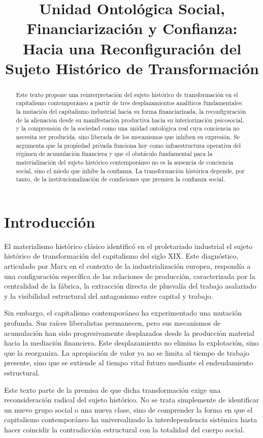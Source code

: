\documentclass[12pt,a4paper]{article}
\title{Unidad Ontológica Social, Financiarización y Confianza: \\
Hacia una Reconfiguración del Sujeto Histórico de Transformación}
\author{}
\date{}
\begin{document}
\maketitle

\begin{abstract}
Este texto propone una reinterpretación del sujeto histórico de transformación en el capitalismo contemporáneo a partir de tres desplazamientos analíticos fundamentales: la mutación del capitalismo industrial hacia su forma financiarizada, la reconfiguración de la alienación desde su manifestación productiva hacia su interiorización psicosocial, y la comprensión de la sociedad como una unidad ontológica real cuya conciencia no necesita ser producida, sino liberada de los mecanismos que inhiben su expresión. Se argumenta que la propiedad privada funciona hoy como infraestructura operativa del régimen de acumulación financiera y que el obstáculo fundamental para la materialización del sujeto histórico contemporáneo no es la ausencia de conciencia social, sino el miedo que inhibe la confianza. La transformación histórica depende, por tanto, de la institucionalización de condiciones que premien la confianza social.
\end{abstract}

\section{Introducción}

El materialismo histórico clásico identificó en el proletariado industrial el sujeto histórico de transformación del capitalismo del siglo XIX. Este diagnóstico, articulado por Marx en el contexto de la industrialización europea, respondía a una configuración específica de las relaciones de producción, caracterizada por la centralidad de la fábrica, la extracción directa de plusvalía del trabajo asalariado y la visibilidad estructural del antagonismo entre capital y trabajo.

Sin embargo, el capitalismo contemporáneo ha experimentado una mutación profunda. Sus raíces liberalistas permanecen, pero sus mecanismos de acumulación han sido progresivamente desplazados desde la producción material hacia la mediación financiera. Este desplazamiento no elimina la explotación, sino que la reorganiza. La apropiación de valor ya no se limita al tiempo de trabajo presente, sino que se extiende al tiempo vital futuro mediante el endeudamiento estructural.

Este texto parte de la premisa de que dicha transformación exige una reconsideración radical del sujeto histórico. No se trata simplemente de identificar un nuevo grupo social o una nueva clase, sino de comprender la forma en que el capitalismo contemporáneo ha universalizado la interdependencia sistémica hasta hacer coincidir la contradicción estructural con la totalidad del cuerpo social.
\end{document}
